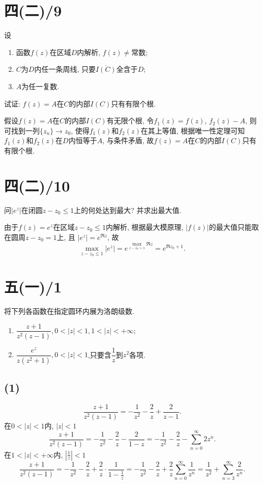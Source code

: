 \documentclass[11pt,a4paper]{article}
\begin{document}
\section{四(二)/9}
\begin{problem}
设
\begin{enumerate}
  \item 函数$f(z)$在区域$D$内解析, $f(z)\neq$常数;
  \item $C$为$D$内任一条周线, 只要$\overline{I(C)}$全含于$D$;
  \item $A$为任一复数.
\end{enumerate}
试证: $f(z)=A$在$C$的内部$I(C)$只有有限个根.
\end{problem}

假设$f(z)=A$在$C$的内部$I(C)$有无限个根, 令$f_1(z)=f(z)$, $f_2(z)-A$, 则可找到一列$\{z_n\}\to z_0$, 使得$f_1(z)$和$f_2(z)$在其上等值, 根据唯一性定理可知$f_1(z)$和$f_2(z)$在$D$内恒等于$A$, 与条件矛盾, 故$f(z)=A$在$C$的内部$I(C)$只有有限个根.

\section{四(二)/10}
\begin{problem}
问$|e^z|$在闭圆$z-z_0\leqslant1$上的何处达到最大? 并求出最大值.
\end{problem}
由于$f(z)=e^z$在区域$z-z_0\leqslant1$内解析, 根据最大模原理, $|f(z)|$的最大值只能取在圆周$z-z_0=1$上, 且
$|e^z|=e^{\Re z}$, 故
$$\max_{z-z_0\leqslant1}|e^z|=e^{\max\limits_{z-z_0=1}\Re z}=e^{\Re z_0+1}.$$

\section{五(一)/1}
\begin{problem}
将下列各函数在指定圆环内展为洛朗级数.
\begin{enumerate}
  \item $\dfrac{z+1}{z^2(z-1)},0<|z|<1,1<|z|<+\infty$;
        \addtocounter{enumi}{1}
  \item $\dfrac{e^z}{z(z^2+1)},0<|z|<1$,只要含$\dfrac{1}{z}$到$z^2$各项.
\end{enumerate}
\end{problem}
\subsection*{(1)}
$$\frac{z+1}{z^2(z-1)}=-\frac{1}{z^2}-\frac{2}{z}+\frac{2}{z-1}.$$
在$0<|z|<1$内, $|z|<1$
$$\frac{z+1}{z^2(z-1)}=-\frac{1}{z^2}-\frac{2}{z}-\frac{2}{1-z}=-\frac{1}{z^2}-\frac{2}{z}-\sum_{n=0}^\infty 2z^n.$$
在$1<|z|<+\infty$内, $\left|\frac{1}{z}\right|<1$
$$\frac{z+1}{z^2(z-1)}=-\frac{1}{z^2}-\frac{2}{z}+\frac{2}{z}\cdot\frac{1}{1-\frac{1}{z}}=-\frac{1}{z^2}-\frac{2}{z}+\frac{2}{z}\sum_{n=0}^\infty \frac{1}{z^n}=\frac{1}{z^2}+\sum_{n=3}^\infty \frac{2}{z^n}.$$
\end{document}

